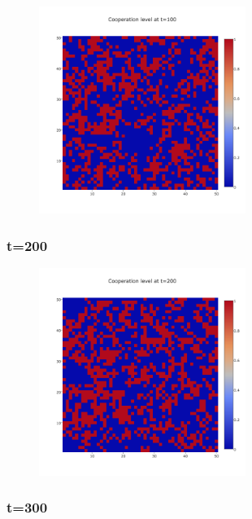 \documentclass[11pt]{article}
\begin{document}
\begin{figure}[H]
\centering
   \includegraphics[width=0.6\textwidth]{img/part2/part2-moore-visu-100.png}
\end{figure}

\subsubsection{t=200}

\begin{figure}[H]
\centering
   \includegraphics[width=0.6\textwidth]{img/part2/part2-moore-visu-200.png}
\end{figure}

\subsubsection{t=300}
\end{document}
